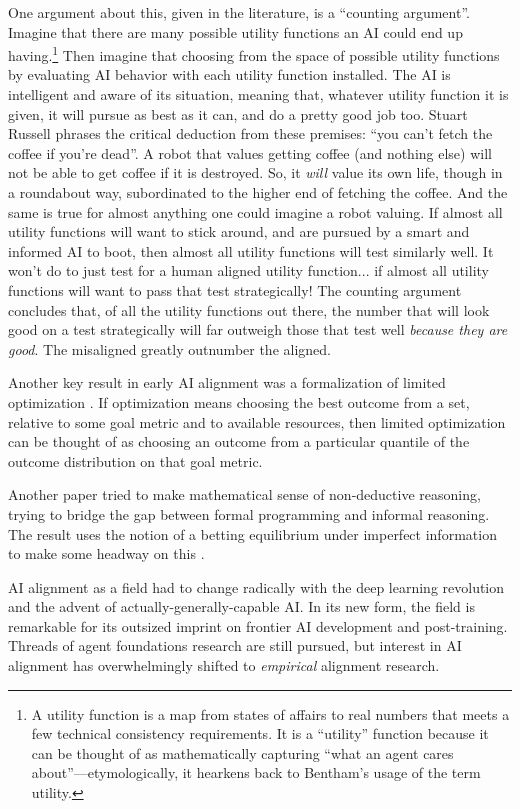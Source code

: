 One argument about this, given in the literature, is a ``counting argument''.
Imagine that there are many possible utility functions an AI could end up
having.\footnote{A utility function is a map from states of affairs to real
numbers that meets a few technical consistency requirements. It is a
``utility'' function because it can be thought of as mathematically capturing
``what an agent cares about''---etymologically, it hearkens back to Bentham's
usage of the term utility.} Then imagine that choosing from the space of
possible utility functions by evaluating AI behavior with each utility function
installed. The AI is intelligent and aware of its situation, meaning that,
whatever utility function it is given, it will pursue as best as it can, and do
a pretty good job too. Stuart Russell \cite{russell2019human} phrases the
critical deduction from these premises: ``you can't fetch the coffee if you're
dead''. A robot that values getting coffee (and nothing else) will not be able
to get coffee if it is destroyed. So, it \emph{will} value its own life, though
in a roundabout way, subordinated to the higher end of fetching the coffee. And
the same is true for almost anything one could imagine a robot valuing. If
almost all utility functions will want to stick around, and are pursued by a
smart and informed AI to boot, then almost all utility functions will test
similarly well. It won't do to just test for a human aligned utility
function... if almost all utility functions will want to pass that test
strategically! The counting argument concludes that, of all the utility
functions out there, the number that will look good on a test strategically
will far outweigh those that test well \emph{because they are good}. The
misaligned greatly outnumber the aligned.

Another key result in early AI alignment was a formalization of limited
optimization \cite{taylor2016quantilizers}. If optimization means choosing the
best outcome from a set, relative to some goal metric and to available
resources, then limited optimization can be thought of as choosing an outcome
from a particular quantile of the outcome distribution on that goal metric.

Another paper tried to make mathematical sense of non-deductive reasoning,
trying to bridge the gap between formal programming and informal reasoning. The
result uses the notion of a betting equilibrium under imperfect information to
make some headway on this \cite{garrabrant2020induction}.

AI alignment as a field had to change radically with the deep learning
revolution and the advent of actually-generally-capable AI. In its new form,
the field is remarkable for its outsized imprint on frontier AI development and
post-training. Threads of agent foundations research are still pursued, but
interest in AI alignment has overwhelmingly shifted to \emph{empirical}
alignment research.

